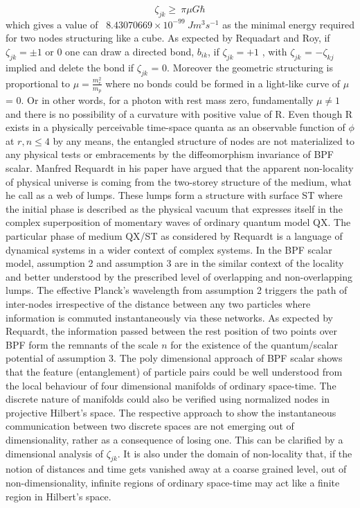 \documentclass{article}
\begin{document}
\begin{equation}
\zeta_{jk} \geq \ \pi \mu G \hbar
\end{equation} 
which gives a value of \ $8.43070669 \times 10^{-99} \ J m^3 s^{-1}$ as the minimal energy required for two nodes structuring like a cube. As expected by Requadart and Roy, if $\zeta_{jk} = \pm 1$ or 0 one can draw a directed bond, $b_{ik}$, if $\zeta_{jk} = +1$ , with $\zeta_{jk}$ = $-\zeta_{kj}$ implied and delete the bond if $\zeta_{jk}$ = 0. Moreover the geometric structuring is proportional to $\mu = \frac{m_e^2}{m_p}$ where no bonds could be formed in a light-like curve of $\mu$ = 0. Or in other words, for a photon with rest mass zero, fundamentally $\mu \neq 1$ and there is no possibility of a curvature with positive value of R. Even though R exists in a physically perceivable time-space quanta as an observable function of $\phi$ at $r,n \leq 4$ by any means, the entangled structure of nodes are not materialized to any physical tests or embracements by the diffeomorphism invariance of BPF scalar. \vspace{4mm}\newline
Manfred Requardt in his paper\cite{21} have argued that the apparent non-locality of physical universe is coming from the two-storey structure of the medium, what he call as a web of lumps. These lumps form a structure with surface ST where the initial phase is described as the physical vacuum that expresses itself in the complex superposition of momentary waves of ordinary quantum model QX. The particular phase of medium QX/ST as considered by Requardt is a language of dynamical systems in a wider context of complex systems. In the BPF scalar model, assumption 2 and assumption 3 are in the similar context of the locality and better understood by the prescribed level of overlapping and non-overlapping lumps. The effective Planck's wavelength from assumption 2 triggers the path of inter-nodes irrespective of the distance between any two particles where information is commuted instantaneously via these networks. As expected by Requardt, the information passed between the rest position of two points over BPF form the remnants of the scale $n$ for the existence of the quantum/scalar potential of assumption 3. The poly dimensional approach of BPF scalar shows that the feature (entanglement) of particle pairs could be well understood from the local behaviour of four dimensional manifolds of ordinary space-time. The discrete nature of manifolds could also be verified using normalized nodes in projective Hilbert's space. The respective approach to show the instantaneous communication between two discrete spaces are not emerging out of dimensionality, rather as a consequence of losing one. This can be clarified by a dimensional analysis of $\zeta_{jk}$. It is also under the domain of non-locality that, if the notion of distances and time gets vanished away at a coarse grained level, out of non-dimensionality, infinite regions of ordinary space-time may act like a finite region in Hilbert's space.
\end{document}
